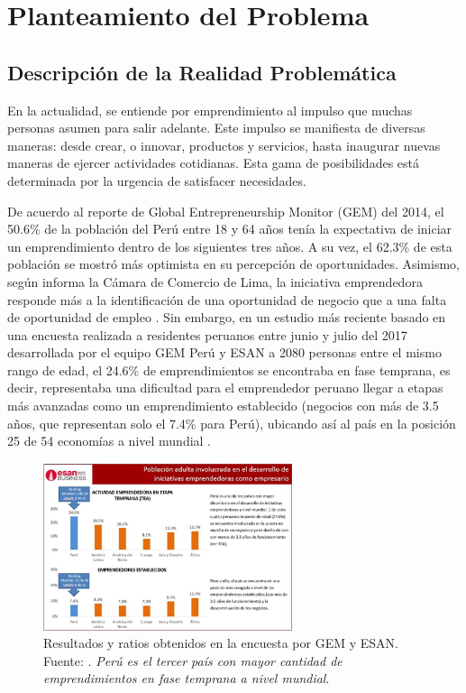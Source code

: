 \chapter{Planteamiento del Problema}
\section{Descripción de la Realidad Problemática}

En la actualidad, se entiende por emprendimiento al impulso que muchas personas asumen para salir adelante. Este impulso se manifiesta de diversas maneras: desde crear, o innovar, productos y servicios, hasta inaugurar nuevas maneras de ejercer actividades cotidianas. Esta gama de posibilidades está determinada por la urgencia de satisfacer necesidades.

De acuerdo al reporte de Global Entrepreneurship Monitor (GEM) del 2014, el 50.6\% de la población del Perú entre 18 y 64 años tenía la expectativa de iniciar un emprendimiento dentro de los siguientes tres años. A su vez, el 62.3\% de esta población se mostró más optimista en su percepción de oportunidades. Asimismo, según informa la Cámara de Comercio de Lima, la iniciativa emprendedora responde más a la identificación de una oportunidad de negocio que a una falta de oportunidad de empleo \parencite{cr_gestion2015emprendper}. Sin embargo, en un estudio más reciente basado en una encuesta realizada a residentes peruanos entre junio y julio del 2017 desarrollada por el equipo GEM Perú y ESAN a 2080 personas entre el mismo rango de edad, el 24.6\% de emprendimientos se encontraba en fase temprana, es decir, representaba una dificultad para el emprendedor peruano llegar a etapas más avanzadas como un emprendimiento establecido (negocios con más de 3.5 años, que representan solo el 7.4\% para Perú), ubicando así al país en la posición 25 de 54 economías a nivel mundial \parencite{cr_gestion2018emprend}. %

\begin{figure}[h]
	\begin{center}
		\includegraphics[width=0.65\textwidth]{1/figures/cuadro_esan.jpg}
		\caption[Resultados y ratios obtenidos en la encuesta por GEM y ESAN]{Resultados y ratios obtenidos en la encuesta por GEM y ESAN.\\
		Fuente: \cite{cr_gestion2018emprend}. \textit{Perú es el tercer país con mayor cantidad de emprendimientos en fase temprana a nivel mundial}.}
		\label{1:fig}
	\end{center}
\end{figure}


